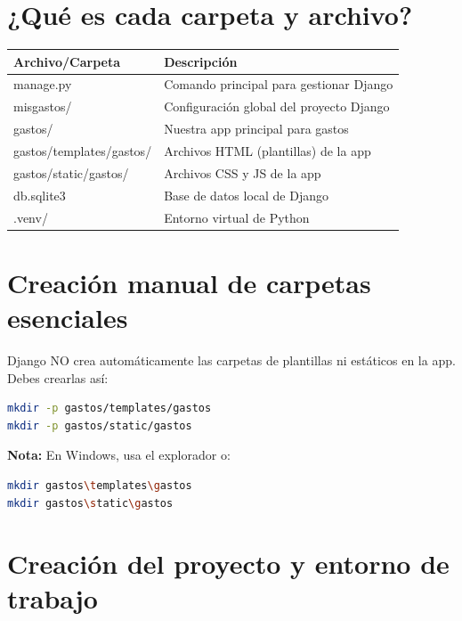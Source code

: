 \documentclass[12pt,a4paper]{article}
\begin{document}
\section{¿Qué es cada carpeta y archivo?}
\begin{tabular}{|l|l|}
\hline
Archivo/Carpeta & Descripción \\
\hline
manage.py & Comando principal para gestionar Django \\
misgastos/ & Configuración global del proyecto Django \\
gastos/ & Nuestra app principal para gastos \\
gastos/templates/gastos/ & Archivos HTML (plantillas) de la app \\
gastos/static/gastos/ & Archivos CSS y JS de la app \\
db.sqlite3 & Base de datos local de Django \\
.venv/ & Entorno virtual de Python \\
\hline
\end{tabular}

\section{Creación manual de carpetas esenciales}
Django NO crea automáticamente las carpetas de plantillas ni estáticos en la app. Debes crearlas así:
\begin{lstlisting}[language=bash]
mkdir -p gastos/templates/gastos
mkdir -p gastos/static/gastos
\end{lstlisting}
\textbf{Nota:} En Windows, usa el explorador o:
\begin{lstlisting}[language=bash]
mkdir gastos\templates\gastos
mkdir gastos\static\gastos
\end{lstlisting}

\section{Creación del proyecto y entorno de trabajo}
\end{document}
